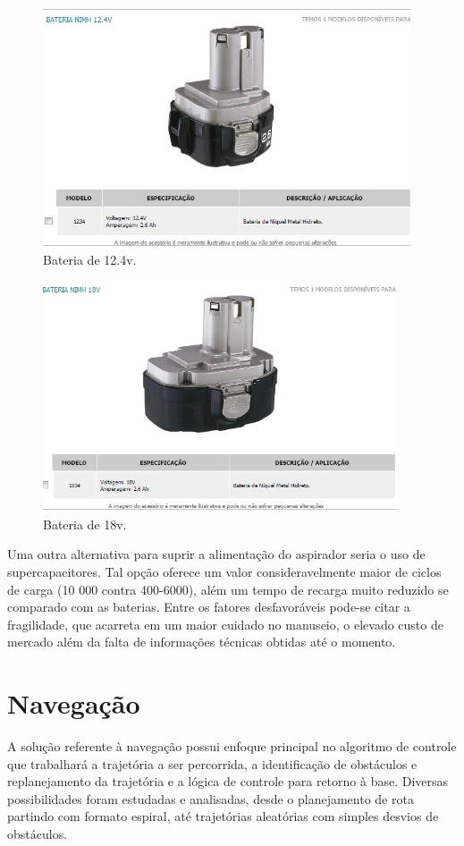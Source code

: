 	\begin{figure}[H]
		\centering
		\includegraphics[scale=0.55]{figuras/bateria_2.png}
		\caption{Bateria de 12.4v.}
		\label{img:bateria_2}
	\end{figure}
	
	\begin{figure}[H]
		\centering
		\includegraphics[scale=0.55]{figuras/bateria_3.png}
		\caption{Bateria de 18v.}
		\label{img:bateria_3}
	\end{figure}

	Uma outra alternativa para suprir a alimentação do aspirador seria o uso de supercapacitores. Tal opção oferece um valor consideravelmente maior de ciclos de carga (10 000 contra 400-6000), além um tempo de recarga muito reduzido se comparado com as baterias. Entre os fatores desfavoráveis pode-se citar a fragilidade, que acarreta em um maior cuidado no manuseio, o elevado custo de mercado além  da falta de informações técnicas obtidas até o momento.

\section{Navegação} %
\label{sub:automação}
	A solução referente à navegação possui enfoque principal no algoritmo de controle que trabalhará a trajetória a ser percorrida, a identificação de obstáculos e replanejamento da trajetória e a lógica de controle para retorno à base. Diversas possibilidades foram estudadas e analisadas, desde o planejamento de rota partindo com formato espiral, até trajetórias aleatórias com simples desvios de obstáculos.

